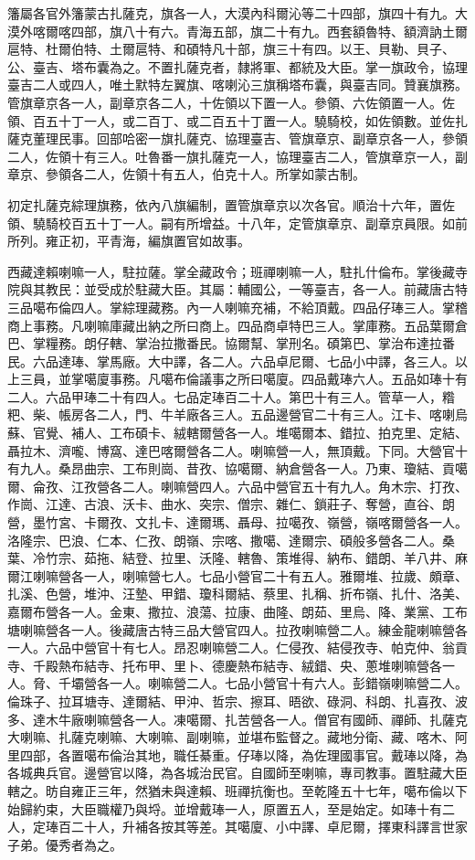 \begin{pinyinscope}
籓屬各官外籓蒙古扎薩克，旗各一人，大漠內科爾沁等二十四部，旗四十有九。大漠外喀爾喀四部，旗八十有六。青海五部，旗二十有九。西套額魯特、額濟訥土爾扈特、杜爾伯特、土爾扈特、和碩特凡十部，旗三十有四。以王、貝勒、貝子、公、臺吉、塔布囊為之。不置扎薩克者，隸將軍、都統及大臣。掌一旗政令，協理臺吉二人或四人，唯土默特左翼旗、喀喇沁三旗稱塔布囊，與臺吉同。贊襄旗務。管旗章京各一人，副章京各二人，十佐領以下置一人。參領、六佐領置一人。佐領、百五十丁一人，或二百丁、或二百五十丁置一人。驍騎校，如佐領數。並佐扎薩克董理民事。回部哈密一旗扎薩克、協理臺吉、管旗章京、副章京各一人，參領二人，佐領十有三人。吐魯番一旗扎薩克一人，協理臺吉二人，管旗章京一人，副章京、參領各二人，佐領十有五人，伯克十人。所掌如蒙古制。

初定扎薩克綜理旗務，依內八旗編制，置管旗章京以次各官。順治十六年，置佐領、驍騎校百五十丁一人。嗣有所增益。十八年，定管旗章京、副章京員限。如前所列。雍正初，平青海，編旗置官如故事。

西藏達賴喇嘛一人，駐拉薩。掌全藏政令；班禪喇嘛一人，駐扎什倫布。掌後藏寺院與其教民：並受成於駐藏大臣。其屬：輔國公，一等臺吉，各一人。前藏唐古特三品噶布倫四人。掌綜理藏務。內一人喇嘛充補，不給頂戴。四品仔琫三人。掌稽商上事務。凡喇嘛庫藏出納之所曰商上。四品商卓特巴三人。掌庫務。五品葉爾倉巴、掌糧務。朗仔轄、掌治拉撒番民。協爾幫、掌刑名。碩第巴、掌治布達拉番民。六品達琫、掌馬廠。大中譯，各二人。六品卓尼爾、七品小中譯，各三人。以上三員，並掌噶廈事務。凡噶布倫議事之所曰噶廈。四品戴琫六人。五品如琫十有二人。六品甲琫二十有四人。七品定琫百二十人。第巴十有三人。管草一人，糌粑、柴、帳房各二人，門、牛羊廠各三人。五品邊營官二十有三人。江卡、喀喇烏蘇、官覺、補人、工布碩卡、絨轄爾營各一人。堆噶爾本、錯拉、拍克里、定結、聶拉木、濟嚨、博窩、達巴喀爾營各二人。喇嘛營一人，無頂戴。下同。大營官十有九人。桑昂曲宗、工布則崗、昔孜、協噶爾、納倉營各一人。乃東、瓊結、貢噶爾、侖孜、江孜營各二人。喇嘛營四人。六品中營官五十有九人。角木宗、打孜、作崗、江達、古浪、沃卡、曲水、突宗、僧宗、雜仁、鎖莊子、奪營，直谷、朗營，墨竹宮、卡爾孜、文扎卡、達爾瑪、聶母、拉噶孜、嶺營，嶺喀爾營各一人。洛隆宗、巴浪、仁本、仁孜、朗嶺、宗喀、撒噶、達爾宗、碩般多營各二人。桑葉、冷竹宗、茹拖、結登、拉里、沃隆、轄魯、策堆得、納布、錯朗、羊八井、麻爾江喇嘛營各一人，喇嘛營七人。七品小營官二十有五人。雅爾堆、拉歲、頗章、扎溪、色營，堆沖、汪墊、甲錯、瓊科爾結、蔡里、扎稱、折布嶺、扎什、洛美、嘉爾布營各一人。金東、撒拉、浪蕩、拉康、曲隆、朗茹、里烏、降、業黨、工布塘喇嘛營各一人。後藏唐古特三品大營官四人。拉孜喇嘛營二人。練金龍喇嘛營各一人。六品中營官十有七人。昂忍喇嘛營二人。仁侵孜、結侵孜寺、帕克仲、翁貢寺、千殿熱布結寺、托布甲、里卜、德慶熱布結寺、絨錯、央、蔥堆喇嘛營各一人。脅、千壩營各一人。喇嘛營二人。七品小營官十有六人。彭錯嶺喇嘛營二人。倫珠子、拉耳塘寺、達爾結、甲沖、哲宗、擦耳、晤欲、碌洞、科朗、扎喜孜、波多、達木牛廠喇嘛營各一人。凍噶爾、扎苦營各一人。僧官有國師、禪師、扎薩克大喇嘛、扎薩克喇嘛、大喇嘛、副喇嘛，並堪布監督之。藏地分衛、藏、喀木、阿里四部，各置噶布倫治其地，職任綦重。仔琫以降，為佐理國事官。戴琫以降，為各城典兵官。邊營官以降，為各城治民官。自國師至喇嘛，專司教事。置駐藏大臣轄之。昉自雍正三年，然猶未與達賴、班禪抗衡也。至乾隆五十七年，噶布倫以下始歸約束，大臣職權乃與埒。並增戴琫一人，原置五人，至是始定。如琫十有二人，定琫百二十人，升補各按其等差。其噶廈、小中譯、卓尼爾，擇東科譯言世家子弟。優秀者為之。


\end{pinyinscope}
